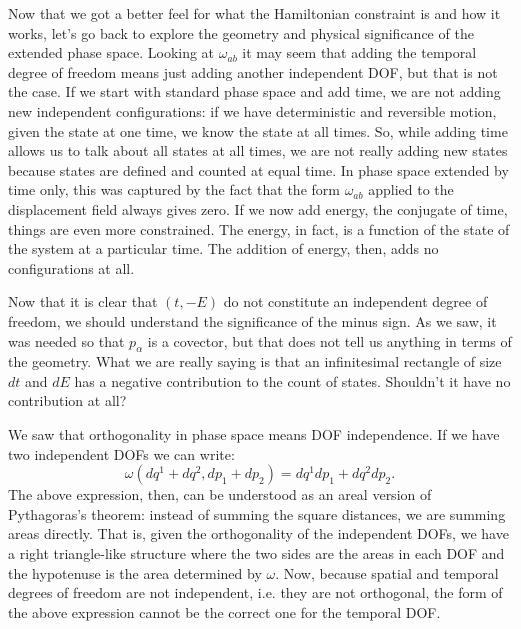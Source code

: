 Now that we got a better feel for what the Hamiltonian constraint is and how it works, let's go back to explore the geometry and physical significance of the extended phase space. Looking at $\omega_{ab}$ it may seem that adding the temporal degree of freedom means just adding another independent DOF, but that is not the case. If we start with standard phase space and add time, we are not adding new independent configurations: if we have deterministic and reversible motion, given the state at one time, we know the state at all times. So, while adding time allows us to talk about all states at all times, we are not really adding new states because states are defined and counted at equal time. In phase space extended by time only, this was captured by the fact that the form $\omega_{ab}$ applied to the displacement field always gives zero. If we now add energy, the conjugate of time, things are even more constrained. The energy, in fact, is a function of the state of the system at a particular time. The addition of energy, then, adds no configurations at all.

Now that it is clear that $(t, -E)$ do not constitute an independent degree of freedom, we should understand the significance of the minus sign. As we saw, it was needed so that $p_\alpha$ is a covector, but that does not tell us anything in terms of the geometry. What we are really saying is that an infinitesimal rectangle of size $dt$ and $dE$ has a negative contribution to the count of states. Shouldn't it have no contribution at all?

We saw that orthogonality in phase space means DOF independence. If we have two independent DOFs we can write:
\begin{equation}\label{rp-cm-spatialPythagoras}
	\omega(dq^1 + dq^2, dp_1 + dp_2) = dq^1 dp_1 + dq^2 dp_2.
\end{equation}
The above expression, then, can be understood as an areal version of Pythagoras's theorem: instead of summing the square distances, we are summing areas directly. That is, given the orthogonality of the independent DOFs, we have a right triangle-like structure where the two sides are the areas in each DOF and the hypotenuse is the area determined by $\omega$.  Now, because spatial and temporal degrees of freedom are not independent, i.e. they are not orthogonal, the form of the above expression cannot be the correct one for the temporal DOF.

